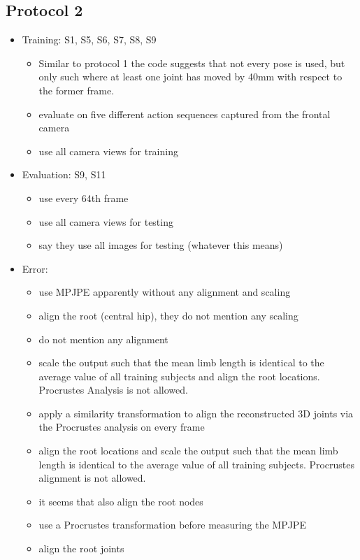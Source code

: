 \documentclass[11pt]{article}
\begin{document}
	\subsection{Protocol 2}
		\begin{itemize}
			\item Training: S1, S5, S6, S7, S8, S9
			\begin{itemize}
				\item Similar to protocol 1 the code suggests that not every pose is used, but only such where at least one joint has moved by 40mm with respect to the former frame.
				\item \cite{bogo16} evaluate on five different action sequences captured from the frontal camera
				\item \cite{tekin16, tekin17} use all camera views for training
			\end{itemize}
			\item Evaluation: S9, S11 
			\begin{itemize}
				\item \cite{sun17} use every 64th frame
				\item \cite{tekin16, tekin17} use all camera views for testing
				\item \cite{moreno-noguer16} say they use all images for testing (whatever this means) 
			\end{itemize}
			\item Error: \begin{itemize}
				\item \cite{sun17} use MPJPE apparently without any alignment and scaling
				\item \cite{martinez17} align the root (central hip), they do not mention any scaling
				\item \cite{tome17} do not mention any alignment
				\item \cite{zhou18} scale the output such that the mean limb length is identical to the average value of all training subjects and align the root locations. Procrustes Analysis is not allowed.
				\item \cite{bogo16} apply a similarity transformation to align the reconstructed 3D joints via the Procrustes analysis on every frame
				\item \cite{zhou16} align the root locations and scale the output such that the mean limb length is identical to the average value of all training subjects. Procrustes alignment is not allowed.
				\item it seems that \cite{tekin16} also align the root nodes
				\item \cite{tekin17} use a Procrustes transformation before measuring the MPJPE
				\item \cite{pavlakos17} align the root joints
			\end{itemize}
		\end{itemize}
	
\end{document}
